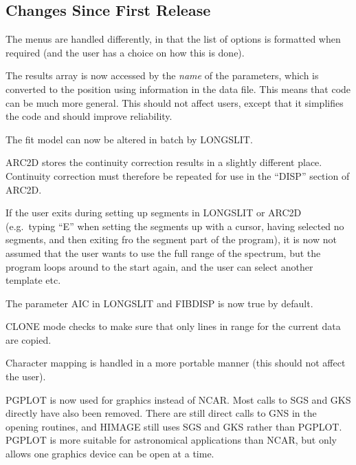 \subsection{Changes Since First Release}
\begin{list}{()}{}
\item
The menus are handled differently, in that the list of options is
formatted when required (and the user has a choice on how this is done).

\item
The results array is now accessed by the {\em name} of the parameters,
which is converted to the position using information in the data file.
This means that code can be much more general.
This should not affect users, except that it simplifies the code and
should improve reliability.

\item
The fit model can now be altered in batch by LONGSLIT.

\item
ARC2D stores the continuity correction results in a slightly different
place.
Continuity correction must therefore be repeated for use in the ``DISP''
section of ARC2D.

\item
If the user exits during setting up segments in LONGSLIT or ARC2D
(e.g.\ typing ``E'' when setting the segments up with a cursor, having
selected no segments, and then exiting fro the segment part of the
program), it is now not assumed that the user wants to use the full
range of the spectrum, but the program loops around to the start again,
and the user can select another template etc.

\item
The parameter AIC in LONGSLIT and FIBDISP is now true by default.

\item
CLONE mode checks to make sure that only lines in range for the current
data are copied.

\item
Character mapping is handled in a more portable manner (this should not
affect the user).

\item
PGPLOT is now used for graphics instead of NCAR.
Most calls to SGS and GKS directly have also been removed.
There are still direct calls to GNS in the opening routines, and HIMAGE
still uses SGS and GKS rather than PGPLOT.
PGPLOT is more suitable for astronomical applications than NCAR, but
only allows one graphics device can be open at a time.


\end{list}

